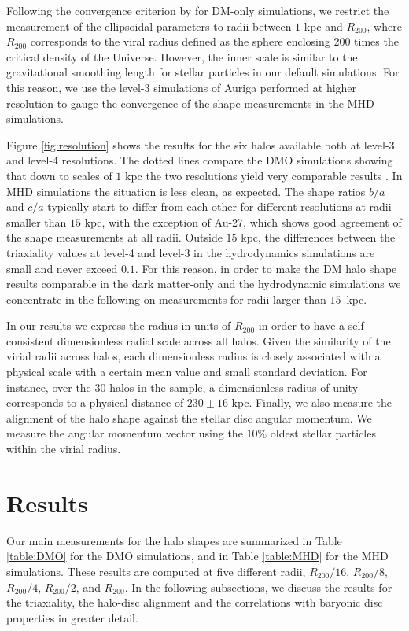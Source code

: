 \documentclass[usenatbib]{mnras}
\begin{document}
Following the convergence criterion by \cite{VeraCiro11} for DM-only simulations,
we restrict the measurement of the ellipsoidal parameters to radii
between $1$ kpc and $R_{200}$, where  $R_{200}$ corresponds to the viral radius
defined as the sphere  enclosing 200 times the critical density of the
Universe. However, the inner scale is similar to the gravitational smoothing length
for stellar particles in our default simulations.
For this reason, we use the level-3 simulations of Auriga performed at higher
resolution to gauge the convergence of the shape measurements in the
MHD simulations.

Figure \ref{fig:resolution} shows the results for the six halos
available both at level-3 and level-4 resolutions.
The dotted lines compare the DMO simulations showing that down to
scales of $1$ kpc the two resolutions yield very comparable results
\citep{VeraCiro11}. 
In MHD simulations the situation is less clean, as expected. 
The shape ratios $b/a$ and $c/a$ typically start to differ
from each other for different resolutions at radii smaller than $15$ kpc, 
with the exception of Au-27, which  shows good agreement of the shape 
measurements at all radii. Outside $15$ kpc, the differences between the triaxiality values at
level-4 and level-3 in the hydrodynamics simulations are small and never exceed $0.1$. 
For this reason, in order to make the DM halo shape results comparable
in the dark matter-only and the hydrodynamic simulations we concentrate in 
the following on measurements for radii larger  than $15$~kpc.


In our results we express the radius in units  of $R_{200}$ in
order to have a self-consistent dimensionless radial scale across all
halos. Given the similarity of the virial radii across halos, each dimensionless radius is
closely associated with a physical scale with a certain mean value and small standard deviation.
For instance, over the 30 halos in the sample, a dimensionless
radius of unity corresponds to a physical distance of $230\pm 16$
kpc.   Finally, we also measure the alignment of the halo shape against the
stellar disc angular momentum.  We measure the angular momentum vector 
using the $10\%$ oldest stellar particles within the virial radius.  


\section{Results}
\label{sec:results}

Our main measurements for the halo shapes are summarized in Table \ref{table:DMO} for the
DMO simulations, and in Table \ref{table:MHD} for the MHD simulations.
These results are computed at five different radii, $R_{200}/16$,
$R_{200}/8$, $R_{200}/4$, $R_{200}/2$, and $R_{200}$.
In the following subsections, we discuss 
the results for the triaxiality, the halo-disc alignment and the
correlations with baryonic disc properties in greater detail.
\end{document}
